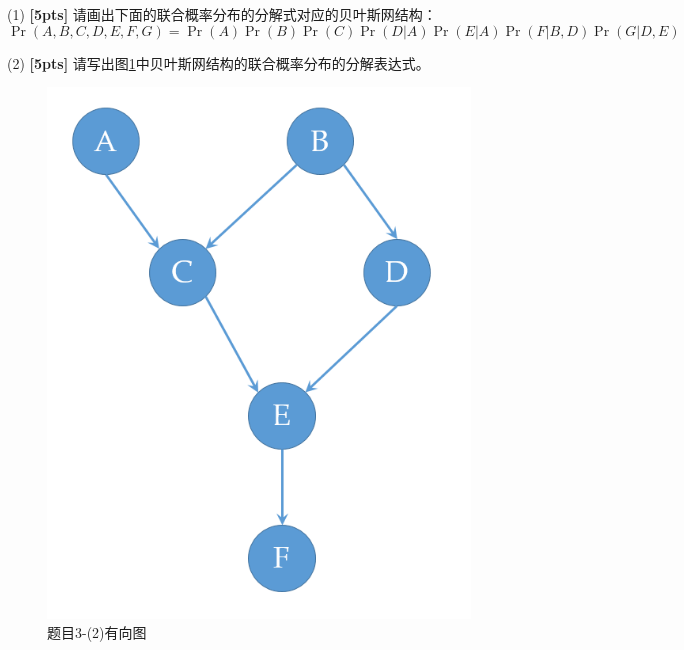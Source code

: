 \documentclass[a4paper,UTF8]{article}
\numberwithin{equation}{section}
\theoremstyle{definition}
\begin{document}
(1) \textbf{[5pts]} 请画出下面的联合概率分布的分解式对应的贝叶斯网结构：
\begin{equation*}
\Pr(A, B, C, D, E, F, G) = \Pr(A)\Pr(B)\Pr(C)\Pr(D|A)\Pr(E|A)\Pr(F|B, D)\Pr(G|D, E)
\end{equation*}

(2) \textbf{[5pts]} 请写出图\ref{fig-DAG}中贝叶斯网结构的联合概率分布的分解表达式。
\begin{figure}[h]
\centering
\includegraphics[scale=0.3]{bayes_net.png}
\caption{题目3-(2)有向图}
\label{fig-DAG}
\end{figure}
\end{document}
